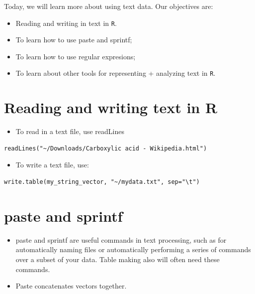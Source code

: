 \documentclass[]{book}
\providecommand{\tightlist}{%
  \setlength{\itemsep}{0pt}\setlength{\parskip}{0pt}}
\theoremstyle{definition}
\theoremstyle{definition}
\theoremstyle{definition}
\theoremstyle{remark}
\begin{document}
Today, we will learn more about using text data. Our objectives are:

\begin{itemize}
\tightlist
\item
  Reading and writing in text in \texttt{R}.
\item
  To learn how to use paste and sprintf;
\item
  To learn how to use regular expresions;
\item
  To learn about other tools for representing + analyzing text in
  \texttt{R}.
\end{itemize}

\section{Reading and writing text in
R}\label{reading-and-writing-text-in-r}

\begin{itemize}
\tightlist
\item
  To read in a text file, use readLines
\end{itemize}

\begin{verbatim}
readLines("~/Downloads/Carboxylic acid - Wikipedia.html")
\end{verbatim}

\begin{itemize}
\tightlist
\item
  To write a text file, use:
\end{itemize}

\begin{verbatim}
write.table(my_string_vector, "~/mydata.txt", sep="\t") 
\end{verbatim}

\section{paste and sprintf}\label{paste-and-sprintf}

\begin{itemize}
\item
  paste and sprintf are useful commands in text processing, such as for
  automatically naming files or automatically performing a series of
  commands over a subset of your data. Table making also will often need
  these commands.
\item
  Paste concatenates vectors together.
\end{itemize}
\end{document}

